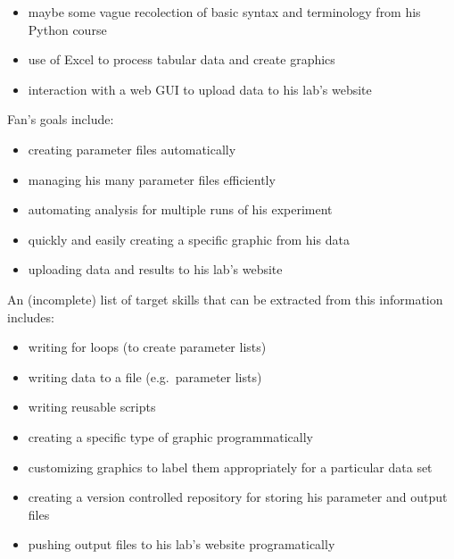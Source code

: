 \documentclass[
]{book}
\providecommand{\tightlist}{%
  \setlength{\itemsep}{0pt}\setlength{\parskip}{0pt}}
\begin{document}
\begin{itemize}
\tightlist
\item
  maybe some vague recolection of basic syntax and terminology from his Python
  course
\item
  use of Excel to process tabular data and create graphics
\item
  interaction with a web GUI to upload data to his lab's website
\end{itemize}

Fan's goals include:

\begin{itemize}
\tightlist
\item
  creating parameter files automatically
\item
  managing his many parameter files efficiently
\item
  automating analysis for multiple runs of his experiment
\item
  quickly and easily creating a specific graphic from his data
\item
  uploading data and results to his lab's website
\end{itemize}

An (incomplete) list of target skills that can be extracted from this information includes:

\begin{itemize}
\tightlist
\item
  writing for loops (to create parameter lists)
\item
  writing data to a file (e.g.~parameter lists)
\item
  writing reusable scripts
\item
  creating a specific type of graphic programmatically
\item
  customizing graphics to label them appropriately for a particular data set
\item
  creating a version controlled repository for storing his parameter and output
  files
\item
  pushing output files to his lab's website programatically
\end{itemize}
\end{document}
